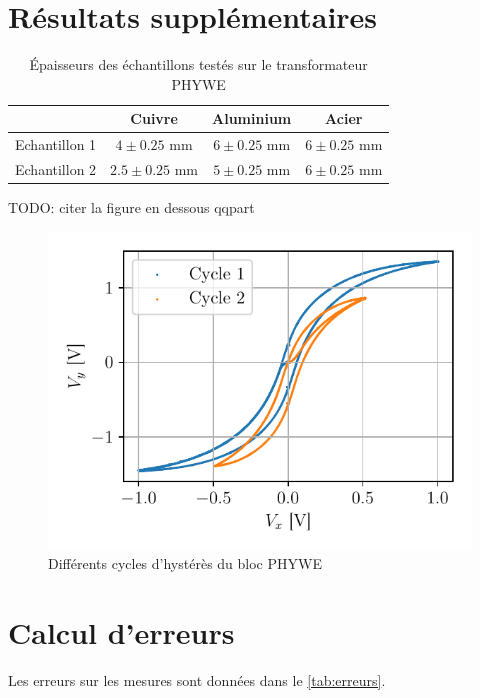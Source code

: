 \section{Résultats supplémentaires}
\label{sec:resultats_bonus}

\begin{table}[h]
    \centering
    \begin{tabulary}{\linewidth}{c c c c}
        \toprule
         & Cuivre & Aluminium & Acier \\
        \midrule
        Echantillon 1 & \(4 \pm 0.25\) \si{\milli\meter} & \(6 \pm 0.25\) \si{\milli\meter} & \(6 \pm 0.25\) \si{\milli\meter}\\
        Echantillon 2 & \(2.5 \pm 0.25\) \si{\milli\meter} & \(5 \pm 0.25\) \si{\milli\meter} & \(6 \pm 0.25\) \si{\milli\meter} \\
        \bottomrule
    \end{tabulary}
    \caption{Épaisseurs des échantillons testés sur le transformateur PHYWE}
    \label{tab:thiccness}
\end{table}

TODO: citer la figure en dessous qqpart
\begin{figure}[h]
    \centering
    \includegraphics[width=0.6\linewidth]{figures/phywe_autres_cycles.pdf}
    \caption{Différents cycles d'hystérès du bloc PHYWE}
    \label{fig:autres_cycles}
\end{figure}

\section{Calcul d'erreurs}
\label{sec:erreurs}

Les erreurs sur les mesures sont données dans le \autoref{tab:erreurs}.

